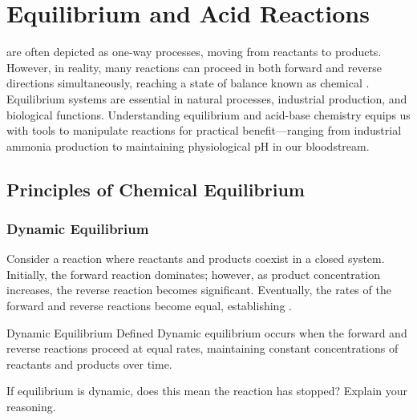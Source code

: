 \chapter{Equilibrium and Acid Reactions}

 are often depicted as one-way processes, moving from reactants to products. However, in reality, many reactions can proceed in both forward and reverse directions simultaneously, reaching a state of balance known as chemical . Equilibrium systems are essential in natural processes, industrial production, and biological functions. Understanding equilibrium and acid-base chemistry equips us with tools to manipulate reactions for practical benefit—ranging from industrial ammonia production to maintaining physiological pH in our bloodstream.

\section{Principles of Chemical Equilibrium}
\FloatBarrier

\subsection{Dynamic Equilibrium}
Consider a reaction where reactants and products coexist in a closed system. Initially, the forward reaction dominates; however, as product concentration increases, the reverse reaction becomes significant. Eventually, the rates of the forward and reverse reactions become equal, establishing .

\begin{keyconcept}{Dynamic Equilibrium Defined}
Dynamic equilibrium occurs when the forward and reverse reactions proceed at equal rates, maintaining constant concentrations of reactants and products over time.
\end{keyconcept}

\begin{marginfigure}[0pt]
\caption{Diagram of a dynamic equilibrium system. Reactant and product molecules continuously interconvert, yet their concentrations remain constant. (Visual to be inserted)}
\end{marginfigure}

\begin{stopandthink}
If equilibrium is dynamic, does this mean the reaction has stopped? Explain your reasoning.
\end{stopandthink}

